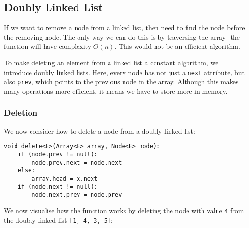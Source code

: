 \documentclass[a4paper, openany]{memoir}
\begin{document}
\subsection{Doubly Linked List}
If we want to remove a node from a linked list, then need to find the node before the removing node. The only way we can do this is by traversing the array- the function will have complexity $O(n)$. This would not be an efficient algorithm.

\noindent To make deleting an element from a linked list a constant algorithm, we introduce doubly linked lists. Here, every node has not just a \texttt{next} attribute, but also \texttt{prev}, which points to the previous node in the array. Although this makes many operations more efficient, it means we have to store more in memory.

\subsubsection{Deletion}
We now consider how to delete a node from a doubly linked list:
\begin{lstlisting}[language=pseudocode]
void delete<E>(Array<E> array, Node<E> node):
    if (node.prev != null):
        node.prev.next = node.next
    else:
        array.head = x.next
    if (node.next != null):
        node.next.prev = node.prev
\end{lstlisting}
We now visualise how the function works by deleting the node with value \texttt{4} from the doubly linked list \texttt{[1, 4, 3, 5]}:
\begin{center}
\end{center}
\end{document}
